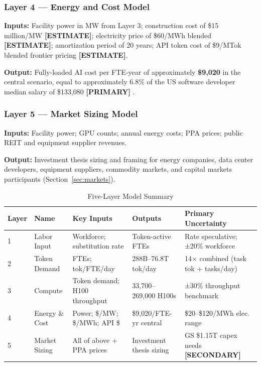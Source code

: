 \documentclass{article}
\newcommand{\PRIMARY}{\textbf{[PRIMARY]}}
\newcommand{\SECONDARY}{\textbf{[SECONDARY]}}
\newcommand{\ESTIMATE}{\textbf{[ESTIMATE]}}
\begin{document}
\subsubsection*{Layer 4 --- Energy and Cost Model}

\textbf{Inputs:} Facility power in MW from Layer 3; construction cost of \$15
million/MW \ESTIMATE{}; electricity price of \$60/MWh blended \ESTIMATE{}; amortization
period of 20 years; API token cost of \$9/MTok blended frontier pricing \ESTIMATE{}.

\textbf{Output:} Fully-loaded AI cost per FTE-year of approximately \textbf{\$9,020} in
the central scenario, equal to approximately 6.8\% of the US software developer median
salary of \$133,080 \PRIMARY{} \citep{bls2024oes}.

\subsubsection*{Layer 5 --- Market Sizing Model}

\textbf{Inputs:} Facility power; GPU counts; annual energy costs; PPA prices; public
REIT and equipment supplier revenues.

\textbf{Output:} Investment thesis sizing and framing for energy companies, data center
developers, equipment suppliers, commodity markets, and capital markets participants
(Section~\ref{sec:markets}).

\begin{table}[ht]
\centering
\caption{Five-Layer Model Summary}
\label{tab:five-layer}
\small
\begin{tabular}{@{}lllll@{}}
\toprule
\textbf{Layer} & \textbf{Name} & \textbf{Key Inputs} & \textbf{Outputs} & \textbf{Primary Uncertainty} \\
\midrule
1 & Labor Input & Workforce; substitution rate & Token-active FTEs & Rate speculative; ±20\% workforce \\
2 & Token Demand & FTEs; tok/FTE/day & 288B--76.8T tok/day & 14× combined (task tok + tasks/day) \\
3 & Compute & Token demand; H100 throughput & 33,700--269,000 H100s & ±30\% throughput benchmark \\
4 & Energy \& Cost & Power; \$/MW; \$/MWh; API \$ & \$9,020/FTE-yr central & \$20--\$120/MWh elec. range \\
5 & Market Sizing & All of above + PPA prices & Investment thesis sizing & GS \$1.15T capex needs \SECONDARY{} \citep{goldmansachs2024capex} \\
\bottomrule
\end{tabular}
\end{table}
\end{document}
